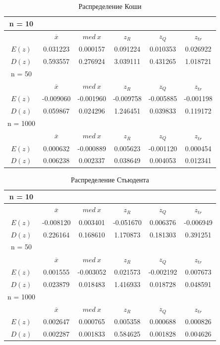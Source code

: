 \documentclass[12pt,a4paper]{article}
\begin{document}
	\begin{table}[h!]
		\centering
		\begin{tabular}{ |c|c|c|c|c|c| }
			\hline
			n = 10 & & & & & \\
			\hline
			&$\overline{x}$ & $med\ x$ & $z_{R}$ & $z_{Q}$ & $z_{tr}$\\
			\hline
			$E(z)$ & 0.031223 & 0.000157 & 0.091224 & 0.010353 & 0.026922 \\
			\hline
			$D(z) $ & 0.593557 & 0.276924 & 3.039111 & 0.431265 & 1.018721 \\
			\hline\hline
			n = 50 & & & & & \\
			\hline
			&$\overline{x}$ & $med\ x$ & $z_{R}$ & $z_{Q}$ & $z_{tr}$\\
			\hline
			$E(z)$ & -0.009060 & -0.001960 & -0.009758 & -0.005885 & -0.001198 \\
			\hline
			$D(z)$ & 0.059867 & 0.024296 & 1.246451 & 0.039833 & 0.119172 \\
			\hline\hline
			n = 1000 & & & & & \\
			\hline
			&$\overline{x}$ & $med\ x$ & $z_{R}$ & $z_{Q}$ & $z_{tr}$\\
			\hline
			$E(z)$ & 0.000632 & -0.000889 & 0.005623 & -0.001120 & 0.000454 \\
			\hline
			$D(z)$ & 0.006238 & 0.002337 & 0.038649 & 0.004053 & 0.012341 \\
			\hline
		\end{tabular}
		\caption{Распределение Коши}
		\label{table:2}
	\end{table}

	\begin{table}[h!]
		\centering
		\begin{tabular}{ |c|c|c|c|c|c| }
			\hline
			n = 10 & & & & & \\
			\hline
			&$\overline{x}$ & $med\ x$ & $z_{R}$ & $z_{Q}$ & $z_{tr}$\\
			\hline
			$E(z)$ & -0.008120 & 0.003401 & -0.051670 & 0.006376 & -0.006949 \\
			\hline
			$D(z) $ & 0.226164 & 0.168610 & 1.170873 & 0.181303 & 0.391251 \\
			\hline\hline
			n = 50 & & & & & \\
			\hline
			&$\overline{x}$ & $med\ x$ & $z_{R}$ & $z_{Q}$ & $z_{tr}$\\
			\hline
			$E(z)$ & 0.001555 & -0.003052 & 0.021573 & -0.002192 & 0.007673 \\
			\hline
			$D(z)$ & 0.023879 & 0.018483 & 1.416933 & 0.018728 & 0.048591 \\
			\hline\hline
			n = 1000 & & & & & \\
			\hline
			&$\overline{x}$ & $med\ x$ & $z_{R}$ & $z_{Q}$ & $z_{tr}$\\
			\hline
			$E(z)$ & 0.002647 & 0.000765 & 0.005358 & 0.000688 & 0.000826 \\
			\hline
			$D(z)$ & 0.002287 & 0.001833 & 0.584625 & 0.001828 & 0.004626 \\
			\hline
		\end{tabular}
		\caption{Распределение Стьюдента}
		\label{table:3}
	\end{table}
\end{document}
